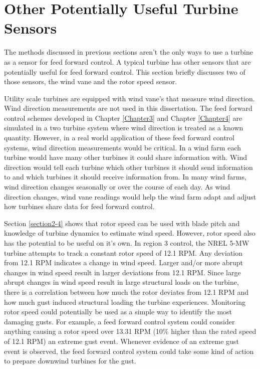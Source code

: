
\section{Other Potentially Useful Turbine Sensors} \label{section2-6}

The methods discussed in previous sections aren't the only ways to use a turbine as a sensor for feed forward control. A typical turbine has other sensors that are potentially useful for feed forward control. This section briefly discusses two of those sensors, the wind vane and the rotor speed sensor.

Utility scale turbines are equipped with wind vane's that measure wind direction. Wind direction measurements are not used in this dissertation. The feed forward control schemes developed in Chapter \ref{Chapter3} and Chapter \ref{Chapter4} are simulated in a two turbine system where wind direction is treated as a known quantity. However, in a real world application of these feed forward control systems, wind direction measurements would be critical. In a wind farm each turbine would have many other turbines it could share information with. Wind direction would tell each turbine which other turbines it should send information to and which turbines it should receive information from. In many wind farms, wind direction changes seasonally or over the course of each day. As wind direction changes, wind vane readings would help the wind farm adapt and adjust how turbines share data for feed forward control.


Section \ref{section2-4} shows that rotor speed can be used with blade pitch and knowledge of turbine dynamics to estimate wind speed. However, rotor speed also has the potential to be useful on it's own. In region 3 control, the NREL 5-MW turbine attempts to track a constant rotor speed of 12.1 RPM. Any deviation from 12.1 RPM indicates a change in wind speed. Larger and/or more abrupt changes in wind speed result in larger deviations from 12.1 RPM. Since large abrupt changes in wind speed result in large structural loads on the turbine, there is a correlation between how much the rotor deviates from 12.1 RPM and how much gust induced structural loading the turbine experiences. Monitoring rotor speed could potentially be used as a simple way to identify the most damaging gusts. For example, a feed forward control system could consider anything causing a rotor speed over 13.31 RPM (10\% higher than the rated speed of 12.1 RPM) an extreme gust event. Whenever evidence of an extreme gust event is observed, the feed forward control system could take some kind of action to prepare downwind turbines for the gust.

